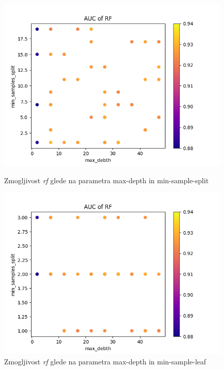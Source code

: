 \documentclass[12pt]{article}
\begin{document}
\begin{figure}[!htb]
      \includegraphics[width=\linewidth]{fig/rf1.png}
      \caption{Zmogljivost \emph{rf} glede na parametra max-depth in min-sample-split}
      \label{fig:rf1}
    \endminipage\hfill
      \includegraphics[width=\linewidth]{fig/rf2.png}
      \caption{Zmogljivost \emph{rf} glede na parametra max-depth in min-sample-leaf}
      \label{fig:rf2}
    \endminipage
\end{figure}
\end{document}

